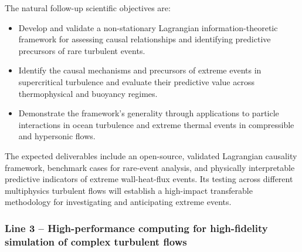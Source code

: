 \documentclass[11pt]{article}
\begin{document}
The natural follow-up scientific objectives are:
\begin{itemize}
	\item[\textbf{O4.}] Develop and validate a non-stationary Lagrangian information-theoretic framework for assessing causal relationships and identifying predictive precursors of rare turbulent events.
	\item[\textbf{O5.}] Identify the causal mechanisms and precursors of extreme events in supercritical turbulence and evaluate their predictive value across thermophysical and buoyancy regimes.
	\item[\textbf{O6.}] Demonstrate the framework's generality through applications to particle interactions in ocean turbulence and extreme thermal events in compressible and hypersonic flows.
\end{itemize}
The expected deliverables include an open-source, validated Lagrangian causality framework, benchmark cases for rare-event analysis, and physically interpretable predictive indicators of extreme wall-heat-flux events.
Its testing across different multiphysics turbulent flows will establish a high-impact transferable methodology for investigating and anticipating extreme events.

\subsubsection{Line 3 -- High-performance computing for high-fidelity simulation of complex turbulent flows}
\end{document}
